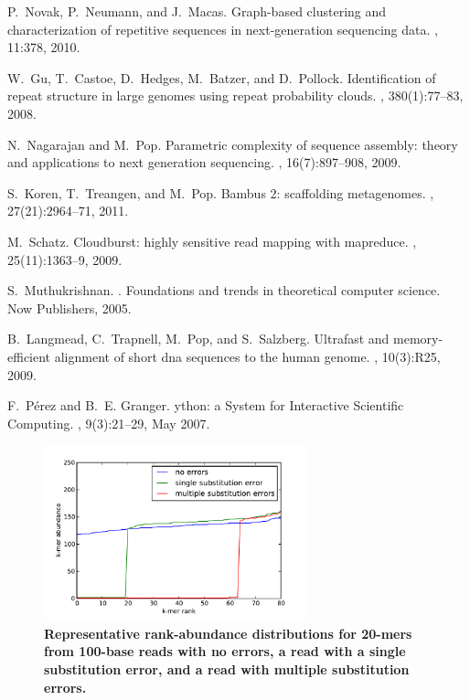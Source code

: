 \documentclass{pnastwo}
\begin{document}
\begin{article}
\begin{thebibliography}{20}
P.~Novak, P.~Neumann, and J.~Macas.
\newblock Graph-based clustering and characterization of repetitive sequences
  in next-generation sequencing data.
, 11:378, 2010.

W.~Gu, T.~Castoe, D.~Hedges, M.~Batzer, and D.~Pollock.
\newblock Identification of repeat structure in large genomes using repeat
  probability clouds.
, 380(1):77--83, 2008.

N.~Nagarajan and M.~Pop.
\newblock Parametric complexity of sequence assembly: theory and applications
  to next generation sequencing.
, 16(7):897--908, 2009.

S.~Koren, T.~Treangen, and M.~Pop.
\newblock Bambus 2: scaffolding metagenomes.
, 27(21):2964--71, 2011.

M.~Schatz.
\newblock Cloudburst: highly sensitive read mapping with mapreduce.
, 25(11):1363--9, 2009.

S.~Muthukrishnan.
.
\newblock Foundations and trends in theoretical computer science. Now
  Publishers, 2005.

B.~Langmead, C.~Trapnell, M.~Pop, and S.~Salzberg.
\newblock Ultrafast and memory-efficient alignment of short dna sequences to
  the human genome.
, 10(3):R25, 2009.

F.~P\'erez and B.~E. Granger.
ython: a {S}ystem for {I}nteractive {S}cientific {C}omputing.
, 9(3):21--29, May 2007.

\end{thebibliography}

\end{article}

\newpage

\begin{figure}
\centerline{\includegraphics[width=3in]{diginorm-ranks.pdf}}
\caption{
{\bf Representative rank-abundance distributions for 20-mers from 100-base reads with no errors,
a read with a single substitution error, and a read with multiple
substitution errors.}}
\label{fig:rankabund}
\end{figure}
\end{document}
